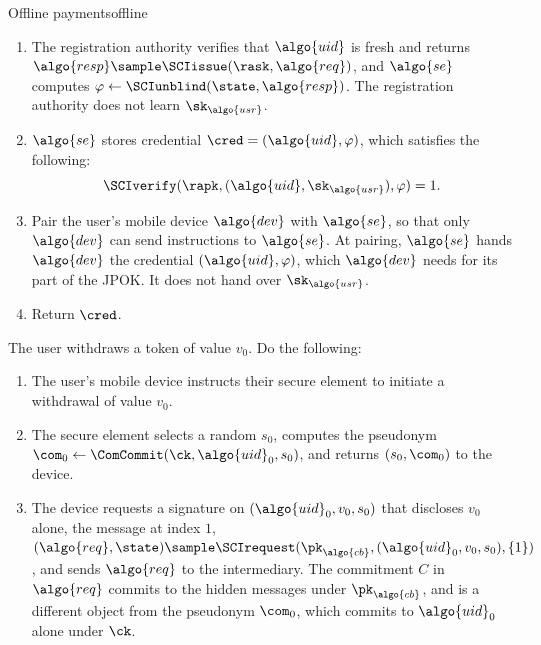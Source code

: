 \begin{protocolbox}{Offline payments}{offline}
\begin{description}
\begin{enumerate}
        \item The registration authority verifies that $\algo{uid}$ is fresh
          and returns $\algo{resp} \sample \SCIissue(\rask, \algo{req})$, and
          $\algo{se}$ computes $\varphi \leftarrow \SCIunblind(\state,
          \algo{resp})$. The registration authority does not learn
          $\sk_{\algo{usr}}$.

        \item $\algo{se}$ stores credential $\cred = (\algo{uid}, \varphi)$,
          which satisfies the following:
          \begin{equation*}
            \SCIverify(\rapk, (\algo{uid}, \sk_{\algo{usr}}), \varphi) = 1.
          \end{equation*}

        \item Pair the user's mobile device $\algo{dev}$ with $\algo{se}$, so
          that only $\algo{dev}$ can send instructions to $\algo{se}$. At
          pairing, $\algo{se}$ hands $\algo{dev}$ the credential $(\algo{uid},
          \varphi)$, which $\algo{dev}$ needs for its part of the JPOK. It does
          not hand over $\sk_{\algo{usr}}$.

        \item Return $\cred$.

      \end{enumerate}

    \item[$T_0 \sample \OPwithdraw(v_0)$ :] The user withdraws a token of value
      $v_0$. Do the following:

      \begin{enumerate}

        \item The user's mobile device instructs their secure element to
          initiate a withdrawal of value $v_0$.

        \item The secure element selects a random $s_0$, computes the pseudonym
          $\com_0 \leftarrow \ComCommit(\ck, \algo{uid}_0, s_0)$, and returns
          $(s_0, \com_0)$ to the device.

        \item The device requests a signature on $(\algo{uid}_0, v_0, s_0)$
          that discloses $v_0$ alone, the message at index $1$, $(\algo{req},
          \state) \sample \SCIrequest(\pk_{\algo{cb}}, (\algo{uid}_0, v_0,
          s_0), \{1\})$, and sends $\algo{req}$ to the intermediary. The
          commitment $C$ in $\algo{req}$ commits to the hidden messages under
          $\pk_{\algo{cb}}$, and is a different object from the pseudonym
          $\com_0$, which commits to $\algo{uid}_0$ alone under $\ck$.


\end{enumerate}
\end{description}
\end{protocolbox}
